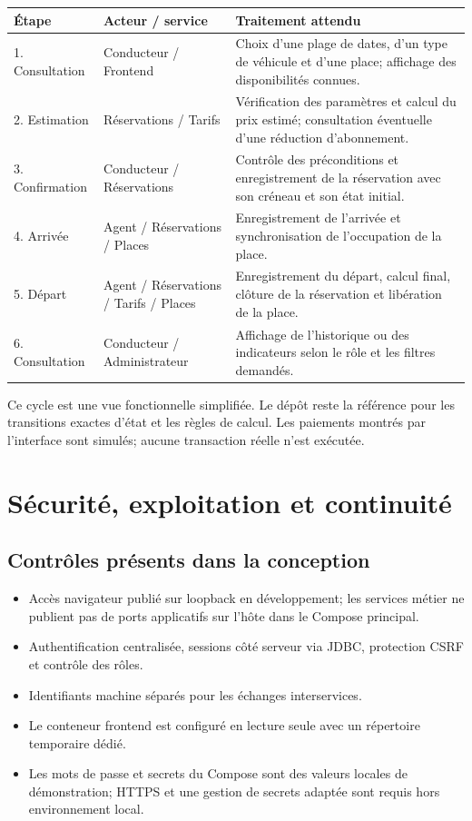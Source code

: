 \documentclass[11pt,a4paper]{report}
\begin{document}
\begin{longtable}{p{2.2cm}p{4.3cm}p{6.6cm}}
\toprule
\textbf{Étape} & \textbf{Acteur / service} & \textbf{Traitement attendu} \\
\midrule
1. Consultation & Conducteur / Frontend & Choix d'une plage de dates, d'un type de véhicule et d'une place; affichage des disponibilités connues. \\
2. Estimation & Réservations / Tarifs & Vérification des paramètres et calcul du prix estimé; consultation éventuelle d'une réduction d'abonnement. \\
3. Confirmation & Conducteur / Réservations & Contrôle des préconditions et enregistrement de la réservation avec son créneau et son état initial. \\
4. Arrivée & Agent / Réservations / Places & Enregistrement de l'arrivée et synchronisation de l'occupation de la place. \\
5. Départ & Agent / Réservations / Tarifs / Places & Enregistrement du départ, calcul final, clôture de la réservation et libération de la place. \\
6. Consultation & Conducteur / Administrateur & Affichage de l'historique ou des indicateurs selon le rôle et les filtres demandés. \\
\bottomrule
\end{longtable}
Ce cycle est une vue fonctionnelle simplifiée. Le dépôt reste la référence pour les transitions exactes d'état et les règles de calcul. Les paiements montrés par l'interface sont simulés; aucune transaction réelle n'est exécutée.

\chapter{Sécurité, exploitation et continuité}
\section{Contrôles présents dans la conception}
\begin{itemize}[leftmargin=*]
  \item Accès navigateur publié sur loopback en développement; les services métier ne publient pas de ports applicatifs sur l'hôte dans le Compose principal.
  \item Authentification centralisée, sessions côté serveur via JDBC, protection CSRF et contrôle des rôles.
  \item Identifiants machine séparés pour les échanges interservices.
  \item Le conteneur frontend est configuré en lecture seule avec un répertoire temporaire dédié.
  \item Les mots de passe et secrets du Compose sont des valeurs locales de démonstration; HTTPS et une gestion de secrets adaptée sont requis hors environnement local.
\end{itemize}
\end{document}
